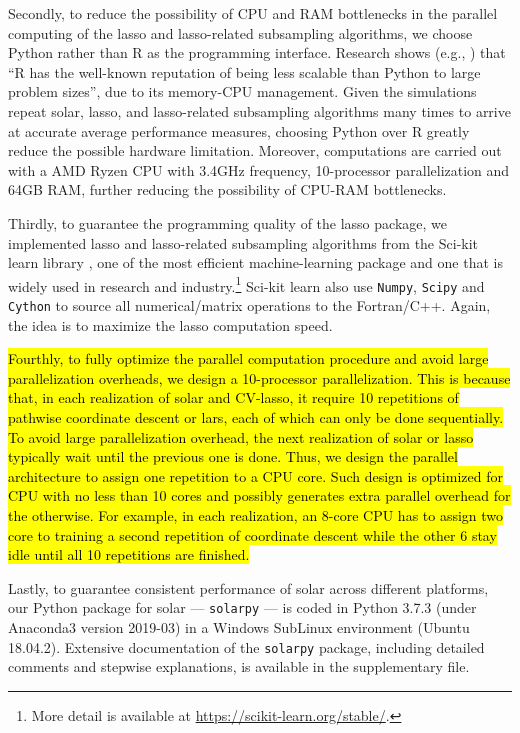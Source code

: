 \documentclass[12pt]{article}
\begin{document}
Secondly, to reduce the possibility of CPU and RAM bottlenecks in the parallel computing of the lasso and lasso-related subsampling algorithms, we choose Python rather than R as the programming interface. Research shows (e.g., \citet{donoho201750})  that ``R has the well-known reputation of being less scalable than Python to large problem sizes'', due to its memory-CPU management. Given the simulations repeat solar, lasso, and lasso-related subsampling algorithms many times to arrive at accurate average performance measures, choosing Python over R greatly reduce the possible hardware limitation. Moreover, computations are carried out with a AMD Ryzen CPU with 3.4GHz frequency, 10-processor parallelization and 64GB RAM, further reducing the possibility of CPU-RAM bottlenecks. 

Thirdly, to guarantee the programming quality of the lasso package, we implemented lasso and lasso-related subsampling algorithms from the {\sf Sci-kit learn} library \citep{scikit-learn}, one of the most efficient machine-learning package and one that is widely used in research and industry.\footnote{More detail is available at \url{https://scikit-learn.org/stable/}.} {\sf Sci-kit learn} also use \texttt{Numpy}, \texttt{Scipy} and \texttt{Cython} to source all numerical/matrix operations to the Fortran/C++. Again, the idea is to maximize the lasso computation speed.

\hl{Fourthly, to fully optimize the parallel computation procedure and avoid large parallelization overheads, we design a 10-processor parallelization. This is because that, in each realization of solar and CV-lasso, it require 10 repetitions of pathwise coordinate descent or lars, each of which can only be done sequentially. To avoid large parallelization overhead, the next realization of solar or lasso typically wait until the previous one is done. Thus, we design the parallel architecture to assign one repetition to a CPU core. Such design is optimized for CPU with no less than 10 cores and possibly generates extra  parallel overhead for the otherwise. For example, in each realization, an 8-core CPU has to assign two core to training a second repetition of coordinate descent while the other 6 stay idle until all 10 repetitions are finished.}

Lastly, to guarantee consistent performance of solar across different platforms, our Python package for solar --- \texttt{solarpy} --- is coded in Python 3.7.3 (under Anaconda3 version 2019-03) in a Windows SubLinux environment (Ubuntu 18.04.2). Extensive documentation of the \texttt{solarpy} package, including detailed comments and stepwise explanations, is available in the supplementary file.
\end{document}
